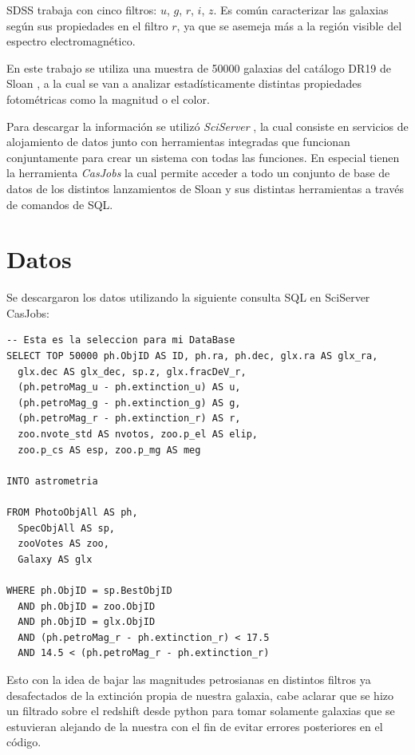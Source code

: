 \documentclass[twocolumn]{article}
\begin{document}
SDSS trabaja con cinco filtros: $u$, $g$, $r$, $i$, $z$. Es común caracterizar las galaxias según sus propiedades en el filtro $r$, ya que se asemeja más a la región visible del espectro electromagnético.

En este trabajo se utiliza una muestra de 50000 galaxias del catálogo DR19 de Sloan \citep{SDSSDR19}, a la cual se van a analizar estadísticamente distintas propiedades fotométricas como la magnitud o el color.

Para descargar la información se utilizó \textit{SciServer} \citep{2016SciServer}, la cual consiste en servicios de alojamiento de datos junto con herramientas integradas que funcionan conjuntamente para crear un sistema con todas las funciones. En especial tienen la herramienta \textit{CasJobs} la cual permite acceder a todo un conjunto de base de datos de los distintos lanzamientos de Sloan y sus distintas herramientas a través de comandos de SQL.

\section{Datos}
Se descargaron los datos utilizando la siguiente consulta SQL en SciServer CasJobs:

\begin{lstlisting}[style=sqlstyle, caption={Consulta SDSS CasJobs}]
-- Esta es la seleccion para mi DataBase 
SELECT TOP 50000 ph.ObjID AS ID, ph.ra, ph.dec, glx.ra AS glx_ra, 
  glx.dec AS glx_dec, sp.z, glx.fracDeV_r,  
  (ph.petroMag_u - ph.extinction_u) AS u, 
  (ph.petroMag_g - ph.extinction_g) AS g, 
  (ph.petroMag_r - ph.extinction_r) AS r, 
  zoo.nvote_std AS nvotos, zoo.p_el AS elip, 
  zoo.p_cs AS esp, zoo.p_mg AS meg
  
INTO astrometria
  
FROM PhotoObjAll AS ph, 
  SpecObjAll AS sp,
  zooVotes AS zoo,
  Galaxy AS glx
  
WHERE ph.ObjID = sp.BestObjID 
  AND ph.ObjID = zoo.ObjID
  AND ph.ObjID = glx.ObjID
  AND (ph.petroMag_r - ph.extinction_r) < 17.5
  AND 14.5 < (ph.petroMag_r - ph.extinction_r)
\end{lstlisting}

Esto con la idea de bajar las magnitudes petrosianas en distintos filtros ya desafectados de la extinción propia de nuestra galaxia, cabe aclarar que se hizo un filtrado sobre el redshift desde python para tomar solamente galaxias que se estuvieran alejando de la nuestra con el fin de evitar errores posteriores en el código.
\end{document}
